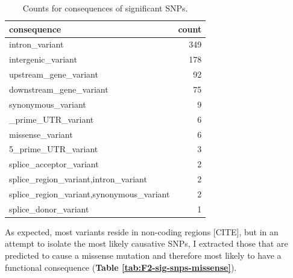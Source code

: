 \documentclass[
]{book}
\begin{document}
\begin{table}

\caption{\label{tab:F2-sig-snps-consq-counts}Counts for consequences of significant SNPs.}
\centering
\begin{tabular}[t]{lr}
\toprule
consequence & count\\
\midrule
intron\_variant & 349\\
intergenic\_variant & 178\\
upstream\_gene\_variant & 92\\
downstream\_gene\_variant & 75\\
synonymous\_variant & 9\\
\addlinespace
3\_prime\_UTR\_variant & 6\\
missense\_variant & 6\\
5\_prime\_UTR\_variant & 3\\
splice\_acceptor\_variant & 2\\
splice\_region\_variant,intron\_variant & 2\\
\addlinespace
splice\_region\_variant,synonymous\_variant & 2\\
splice\_donor\_variant & 1\\
\bottomrule
\end{tabular}
\end{table}

As expected, most variants reside in non-coding regions {[}CITE{]}, but in an attempt to isolate the most likely causative SNPs, I extracted those that are predicted to cause a missense mutation and therefore most likely to have a functional consequence (\textbf{Table \ref{tab:F2-sig-snps-missense}}).
\end{document}
